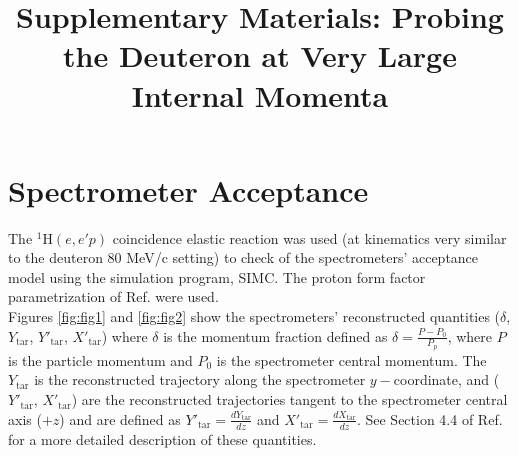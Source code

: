 \documentclass[aps, prl]{revtex4-2}  %
\begin{document}
\title{Supplementary Materials: Probing the Deuteron at Very Large Internal Momenta}
\maketitle
\section{\large Spectrometer Acceptance}
\noindent The $^{1}$H$(e,e'p)$ coincidence elastic reaction was used (at kinematics very similar to the deuteron 80 MeV/c setting) to check of the spectrometers'
acceptance model\cite{COSY} using the simulation program, SIMC. The proton form factor parametrization of Ref.\cite{PhysRevC.69.022201} were used. \\
\indent Figures \ref{fig:fig1} and \ref{fig:fig2} show the spectrometers' reconstructed quantities ($\delta$,  $Y_{\mathrm{tar}}$, $Y'_{\mathrm{tar}}$, $X'_{\mathrm{tar}}$)
where $\delta$ is the momentum fraction defined as $\delta = \frac{P-P_{0}}{P_{p}}$, where $P$ is the particle momentum and $P_{0}$ is the spectrometer central momentum.
The $Y_{\mathrm{tar}}$ is the reconstructed trajectory along the spectrometer $y-$coordinate, and ($Y'_{\mathrm{tar}}$, $X'_{\mathrm{tar}}$) are the reconstructed trajectories
tangent to the spectrometer central axis ($+z$) and are defined as $Y'_{\mathrm{tar}} = \frac{dY_{\mathrm{tar}}}{dz}$ and $X'_{\mathrm{tar}} = \frac{dX_{\mathrm{tar}}}{dz}$.
See Section 4.4 of Ref.\cite{cyero_phdthesis} for a more detailed description of these quantities.\\
\end{document}
